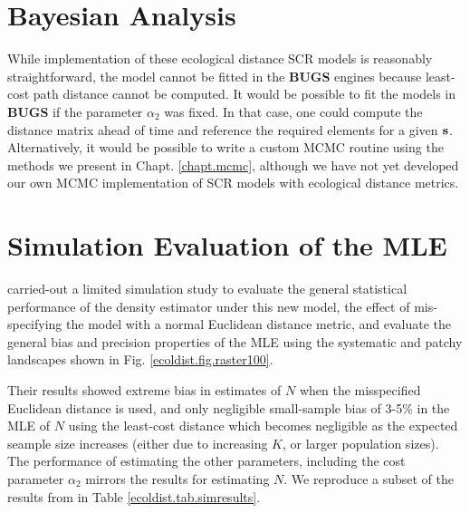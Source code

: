 \section{Bayesian Analysis}

While implementation of these ecological distance SCR models is
reasonably straightforward, the model cannot be fitted
in the  {\bf BUGS} engines because least-cost path distance cannot be computed.
It would be possible to fit the models
in {\bf BUGS} if the parameter $\alpha_{2}$ was fixed. In that case,
one could compute the distance matrix ahead of time and reference the
required elements for a given ${\bf s}$.
Alternatively, it would be possible to write a custom MCMC routine
using the methods we present in Chapt. \ref{chapt.mcmc}, although we
have not yet developed our own MCMC implementation of SCR models with
ecological distance metrics.


\section{Simulation Evaluation of the MLE}

\citet{royle_etal:2012ecol}
carried-out a limited simulation study to evaluate the
general statistical performance of the density estimator under
this new model, the effect of mis-specifying the model with a
normal Euclidean distance metric, and evaluate the general bias and
precision properties of the MLE using the systematic and patchy
landscapes shown in
Fig. \ref{ecoldist.fig.raster100}.

Their results showed extreme
bias in estimates of $N$ when the misspecified Euclidean distance is
used, and only negligible small-sample
 bias of 3-5\% in the MLE of $N$ using the
least-cost distance which becomes negligible as the expected seample
size increases (either due to increasing $K$, or larger population sizes).
The performance of estimating the other parameters, including the
cost parameter $\alpha_{2}$ mirrors
the results for estimating $N$.
We reproduce a subset of the results from \citet{royle_etal:2012ecol}
in Table \ref{ecoldist.tab.simresults}.

